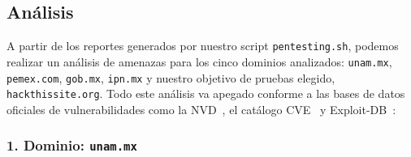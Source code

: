 \subsection*{Análisis}

A partir de los reportes generados por nuestro script \texttt{pentesting.sh}, podemos realizar un análisis de amenazas para los cinco dominios analizados: \texttt{unam.mx}, \texttt{pemex.com}, \texttt{gob.mx}, \texttt{ipn.mx} y nuestro objetivo de pruebas elegido, \texttt{hackthissite.org}. Todo este análisis va apegado conforme a las bases de datos oficiales de vulnerabilidades como la NVD~\cite{nvd_database}, el catálogo CVE~\cite{mitre_cve} y Exploit-DB~\cite{exploit_db}:

\subsubsection*{1. Dominio: \texttt{unam.mx}}

